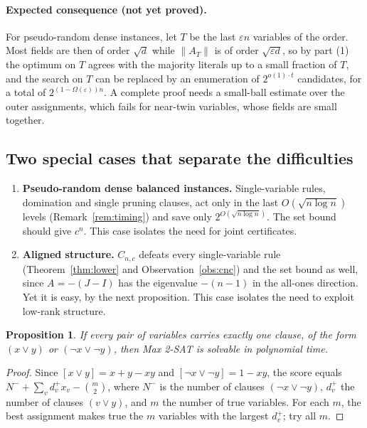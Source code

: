 \documentclass[11pt,a4paper]{article}
\newtheorem{proposition}[theorem]{Proposition}
\theoremstyle{remark}
\begin{document}
\paragraph{Expected consequence (not yet proved).} For pseudo-random dense
instances, let $T$ be the last $\varepsilon n$ variables of the order. Most
fields are then of order $\sqrt d$ while $\|A_T\|$ is of order
$\sqrt{\varepsilon d}$, so by part (1) the optimum on $T$ agrees with the
majority literals up to a small fraction of $T$, and the search on $T$ can be
replaced by an enumeration of $2^{o(1)\cdot t}$ candidates, for a total of
$2^{(1-\Omega(\varepsilon))n}$. A complete proof needs a small-ball estimate over
the outer assignments, which fails for near-twin variables, whose fields are
small together.

\subsection{Two special cases that separate the difficulties}

\begin{enumerate}
 \item \textbf{Pseudo-random dense balanced instances.} Single-variable rules,
 domination and single pruning clauses, act only in the last
 $O(\sqrt{n\log n})$ levels (Remark~\ref{rem:timing}) and save only
 $2^{O(\sqrt{n\log n})}$. The set bound should give $c^n$. This case isolates
 the need for joint certificates.
 \item \textbf{Aligned structure.} $C_{n,c}$ defeats every single-variable rule
 (Theorem~\ref{thm:lower} and Observation~\ref{obs:cnc}) and the set bound as
 well, since $A=-(J-I)$ has the eigenvalue $-(n-1)$ in the all-ones direction.
 Yet it is easy, by the next proposition. This case isolates the need to
 exploit low-rank structure.
\end{enumerate}

\begin{proposition}\label{prop:aligned-easy}
If every pair of variables carries exactly one clause, of the form $(x\lor y)$
or $(\neg x\lor\neg y)$, then Max 2-SAT is solvable in polynomial time.
\end{proposition}

\begin{proof}
Since $[x\lor y]=x+y-xy$ and $[\neg x\lor\neg y]=1-xy$, the score equals
$N^-+\sum_vd^+_vx_v-\binom m2$, where $N^-$ is the number of clauses
$(\neg x\lor\neg y)$, $d^+_v$ the number of clauses $(v\lor y)$, and $m$ the
number of true variables. For each $m$, the best assignment makes true the $m$
variables with the largest $d^+_v$; try all $m$.
\end{proof}
\end{document}
